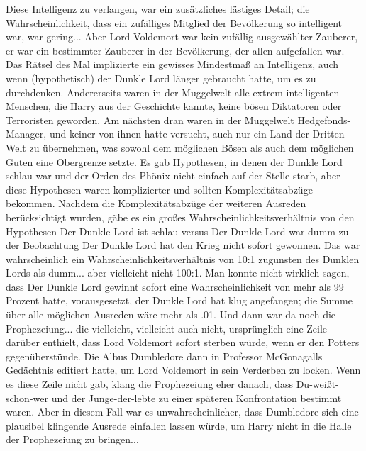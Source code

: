 Diese Intelligenz zu verlangen, war ein zusätzliches lästiges Detail; die
Wahrscheinlichkeit, dass ein zufälliges Mitglied der Bevölkerung so intelligent
war, war gering... Aber Lord Voldemort war kein zufällig ausgewählter Zauberer,
er war ein bestimmter Zauberer in der Bevölkerung, der allen aufgefallen war.
Das Rätsel des Mal implizierte ein gewisses Mindestmaß an Intelligenz, auch wenn
(hypothetisch) der Dunkle Lord länger gebraucht hatte, um es zu durchdenken.
Andererseits waren in der Muggelwelt alle extrem intelligenten Menschen, die
Harry aus der Geschichte kannte, keine bösen Diktatoren oder Terroristen
geworden. Am nächsten dran waren in der Muggelwelt Hedgefonds-Manager, und
keiner von ihnen hatte versucht, auch nur ein Land der Dritten Welt zu
übernehmen, was sowohl dem möglichen Bösen als auch dem möglichen Guten eine
Obergrenze setzte. Es gab Hypothesen, in denen der Dunkle Lord schlau war und
der Orden des Phönix nicht einfach auf der Stelle starb, aber diese Hypothesen
waren komplizierter und sollten Komplexitätsabzüge bekommen. Nachdem die
Komplexitätsabzüge der weiteren Ausreden berücksichtigt wurden, gäbe es ein
großes Wahrscheinlichkeitsverhältnis von den Hypothesen \glqq Der Dunkle Lord
ist schlau\grqq{} versus \glqq Der Dunkle Lord war dumm\grqq{} zu der
Beobachtung \glqq Der Dunkle Lord hat den Krieg nicht sofort gewonnen\grqq{}.
Das war wahrscheinlich ein Wahrscheinlichkeitsverhältnis von 10:1 zugunsten des
Dunklen Lords als dumm... aber vielleicht nicht 100:1. Man konnte nicht wirklich
sagen, dass \glqq Der Dunkle Lord gewinnt sofort\grqq{} eine Wahrscheinlichkeit
von mehr als 99 Prozent hatte, vorausgesetzt, der Dunkle Lord hat klug
angefangen; die Summe über alle möglichen Ausreden wäre mehr als .01. Und dann
war da noch die Prophezeiung... die vielleicht, vielleicht auch nicht,
ursprünglich eine Zeile darüber enthielt, dass Lord Voldemort sofort sterben
würde, wenn er den Potters gegenüberstünde. Die Albus Dumbledore dann in
Professor McGonagalls Gedächtnis editiert hatte, um Lord Voldemort in sein
Verderben zu locken. Wenn es diese Zeile nicht gab, klang die Prophezeiung eher
danach, dass Du-weißt-schon-wer und der Junge-der-lebte zu einer späteren
Konfrontation bestimmt waren. Aber in diesem Fall war es unwahrscheinlicher,
dass Dumbledore sich eine plausibel klingende Ausrede einfallen lassen würde, um
Harry nicht in die Halle der Prophezeiung zu bringen...

